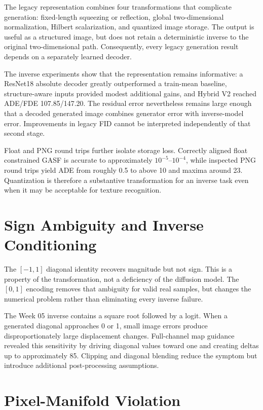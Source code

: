 \documentclass[12pt,a4paper,oneside]{report}
\begin{document}
The legacy representation combines four transformations that complicate generation: fixed-length squeezing or reflection, global two-dimensional normalization, Hilbert scalarization, and quantized image storage. The output is useful as a structured image, but does not retain a deterministic inverse to the original two-dimensional path. Consequently, every legacy generation result depends on a separately learned decoder.

The inverse experiments show that the representation remains informative: a ResNet18 absolute decoder greatly outperformed a train-mean baseline, structure-aware inputs provided modest additional gains, and Hybrid V2 reached ADE/FDE 107.85/147.20. The residual error nevertheless remains large enough that a decoded generated image combines generator error with inverse-model error. Improvements in legacy FID cannot be interpreted independently of that second stage.

Float and PNG round trips further isolate storage loss. Correctly aligned float constrained GASF is accurate to approximately $10^{-5}$--$10^{-4}$, while inspected PNG round trips yield ADE from roughly 0.5 to above 10 and maxima around 23. Quantization is therefore a substantive transformation for an inverse task even when it may be acceptable for texture recognition.

\section{Sign Ambiguity and Inverse Conditioning}

The $[-1,1]$ diagonal identity recovers magnitude but not sign. This is a property of the transformation, not a deficiency of the diffusion model. The $[0,1]$ encoding removes that ambiguity for valid real samples, but changes the numerical problem rather than eliminating every inverse failure.

The Week 05 inverse contains a square root followed by a logit. When a generated diagonal approaches 0 or 1, small image errors produce disproportionately large displacement changes. Full-channel map guidance revealed this sensitivity by driving diagonal values toward one and creating deltas up to approximately 85. Clipping and diagonal blending reduce the symptom but introduce additional post-processing assumptions.

\section{Pixel-Manifold Violation}
\end{document}

